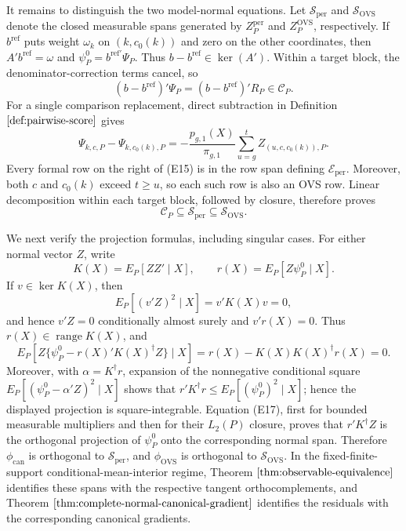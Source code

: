 It remains to distinguish the two model-normal equations.  Let \(\mathscr S_{\mathrm{per}}\) and \(\mathscr S_{\mathrm{OVS}}\) denote the closed measurable spans generated by \(Z_P^{\mathrm{per}}\) and \(Z_P^{\mathrm{OVS}}\), respectively.  If \(b^{\mathrm{ref}}\) puts weight \(\omega_k\) on \((k,c_0(k))\) and zero on the other coordinates, then \(A'b^{\mathrm{ref}}=\omega\) and \(\psi_P^0=b^{\mathrm{ref}\prime}\Psi_P\).  Thus \(b-b^{\mathrm{ref}}\in\ker(A')\).  Within a target block, the denominator-correction terms cancel, so
\[
 (b-b^{\mathrm{ref}})'\Psi_P=(b-b^{\mathrm{ref}})'R_P\in\mathcal C_P.
\tag{E14}
\]
For a single comparison replacement, direct subtraction in Definition \(\ref{def:pairwise-score}\) gives
\[
 \Psi_{k,c,P}-\Psi_{k,c_0(k),P}
 =-\frac{p_{g,1}(X)}{\pi_{g,1}}
   \sum_{u=g}^{t} Z_{(u,c,c_0(k)),P}.
\tag{E15}
\]
Every formal row on the right of (E15) is in the row span defining \(\mathcal E_{\mathrm{per}}\).  Moreover, both \(c\) and \(c_0(k)\) exceed \(t\ge u\), so each such row is also an OVS row.  Linear decomposition within each target block, followed by closure, therefore proves
\[
 \mathcal C_P\subseteq\mathscr S_{\mathrm{per}}
 \subseteq\mathscr S_{\mathrm{OVS}}.
\tag{E16}
\]

We next verify the projection formulas, including singular cases.  For either normal vector \(Z\), write
\[
 K(X)=E_P[ZZ'\mid X],\qquad r(X)=E_P[Z\psi_P^0\mid X].
\]
If \(v\in\ker K(X)\), then
\[
 E_P[(v'Z)^2\mid X]=v'K(X)v=0,
\]
and hence \(v'Z=0\) conditionally almost surely and \(v'r(X)=0\).  Thus \(r(X)\in\operatorname{range}K(X)\), and
\[
 E_P\!\left[Z\{\psi_P^0-r(X)'K(X)^\dagger Z\}\mid X\right]
 =r(X)-K(X)K(X)^\dagger r(X)=0.
\tag{E17}
\]
Moreover, with \(\alpha=K^\dagger r\), expansion of the nonnegative conditional square \(E_P[(\psi_P^0-\alpha'Z)^2\mid X]\) shows that \(r'K^\dagger r\le E_P[(\psi_P^0)^2\mid X]\); hence the displayed projection is square-integrable.  Equation (E17), first for bounded measurable multipliers and then for their \(L_2(P)\) closure, proves that \(r'K^\dagger Z\) is the orthogonal projection of \(\psi_P^0\) onto the corresponding normal span.  Therefore \(\phi_{\mathrm{can}}\) is orthogonal to \(\mathscr S_{\mathrm{per}}\), and \(\phi_{\mathrm{OVS}}\) is orthogonal to \(\mathscr S_{\mathrm{OVS}}\).  In the fixed-finite-support conditional-mean-interior regime, Theorem \(\ref{thm:observable-equivalence}\) identifies these spans with the respective tangent orthocomplements, and Theorem \(\ref{thm:complete-normal-canonical-gradient}\) identifies the residuals with the corresponding canonical gradients.

